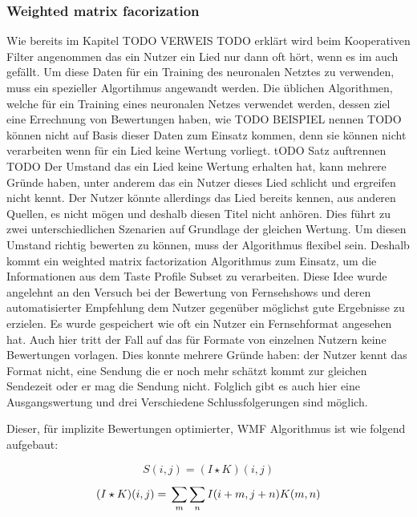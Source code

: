 \documentclass[twosided,a4,10pt]{article}
\begin{document}
\begin{multicols}{2}
		\subsubsection{Weighted matrix facorization}
		
		Wie bereits im Kapitel TODO VERWEIS TODO erklärt wird beim Kooperativen Filter angenommen das ein Nutzer ein Lied nur dann oft hört, wenn es im auch gefällt. Um diese Daten für ein Training des neuronalen Netztes zu verwenden, muss ein spezieller Algortihmus angewandt werden. Die üblichen Algorithmen, welche für ein Training eines neuronalen Netzes verwendet werden, dessen ziel eine Errechnung von Bewertungen haben, wie TODO BEISPIEL nennen TODO können nicht auf Basis dieser Daten zum Einsatz kommen, denn sie können nicht verarbeiten wenn für ein Lied keine Wertung vorliegt. tODO Satz auftrennen TODO Der Umstand das ein Lied keine Wertung erhalten hat, kann mehrere Gründe haben, unter anderem das ein Nutzer dieses Lied schlicht und ergreifen nicht kennt. Der Nutzer könnte allerdings das Lied bereits kennen, aus anderen Quellen, es nicht mögen und deshalb diesen Titel nicht anhören. Dies führt zu zwei unterschiedlichen Szenarien auf Grundlage der gleichen Wertung. Um diesen Umstand richtig bewerten zu können, muss der Algorithmus flexibel sein. Deshalb kommt ein weighted matrix factorization Algorithmus zum Einsatz, um die Informationen aus dem Taste Profile Subset zu verarbeiten. Diese Idee wurde angelehnt an den Versuch bei der Bewertung von Fernsehshows und deren automatisierter Empfehlung dem Nutzer gegenüber möglichst gute Ergebnisse zu erzielen. Es wurde gespeichert wie oft ein Nutzer ein Fernsehformat angesehen hat. Auch hier tritt der Fall auf das für Formate von einzelnen Nutzern keine Bewertungen vorlagen. Dies konnte mehrere Gründe haben: der Nutzer kennt das Format nicht, eine Sendung die er noch mehr schätzt kommt zur gleichen Sendezeit oder er mag die Sendung nicht. Folglich gibt es auch hier eine Ausgangswertung und drei Verschiedene Schlussfolgerungen sind möglich.
		
		Dieser, für implizite Bewertungen optimierter, WMF Algorithmus ist wie folgend aufgebaut:
		
		\begin{equation}\label{WMFAlgorithmus1}
		S(i,j) =(I \star K)(i,j)
		\end{equation}
		\begin{equation}\label{WMFAlgorithmus2}
		(I \star K)(i,j) =\newline\sum_{m}^{}\sum_{n}^{}I(i+m,j+n)K(m,n)
		\end{equation}\newline\\
		

\end{multicols}
\end{document}
